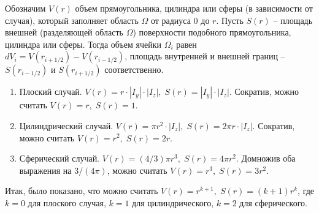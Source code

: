 Обозначим $V(r)$ объем прямоугольника, цилиндра или сферы (в зависимости от случая), который заполняет область $\Omega$ от радиуса $0$ до $r$. Пусть $S(r)$ -- площадь внешней (разделяющей область $\Omega$) поверхности подобного прямоугольника, цилиндра или сферы. Тогда объем ячейки $\Omega_i$ равен $dV_i = V(r_{i + 1/2}) - V(r_{i - 1/2})$, площадь внутренней и внешней границ -- $S(r_{i - 1/2})$ и $S(r_{i + 1/2})$ соответственно.

\begin{enumerate}[label=\arabic*.]
    \item Плоский случай. $V(r) = r \cdot |I_y| \cdot |I_z|, \; S(r) = |I_y| \cdot |I_z|$. Сократив, можно считать $V(r) = r, \; S(r) = 1$.
    \item Цилиндрический случай. $V(r) = \pi r^2 \cdot |I_z|, \; S(r) = 2 \pi r \cdot |I_z|$. Сократив, можно считать $V(r) = r^2, \; S(r) = 2r$.
    \item Сферический случай. $V(r) = (4/3) \pi r^3, \; S(r) = 4 \pi r^2$. Домножив оба выражения на $3/(4\pi)$, можно считать $V(r) = r^3, \; S(r) = 3 r^2$.
\end{enumerate}

Итак, было показано, что можно считать $V(r) = r^{k + 1}, \; S(r) = (k + 1)r^k$, где $k = 0$ для плоского случая, $k = 1$ для цилиндрического, $k = 2$ для сферического.

